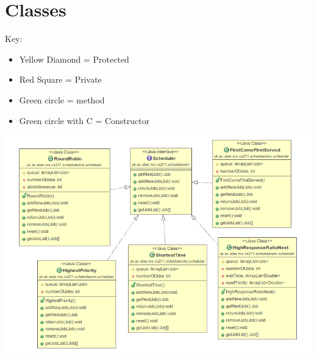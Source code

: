 \documentclass{article}
\begin{document}
\section{Classes}
Key: 
\begin{itemize}
	\item Yellow Diamond = Protected
	\item Red Square = Private
	\item Green circle = method
	\item Green circle with C = Constructor
\end{itemize}
\begin{center}
\includegraphics[scale=0.6]{class.png}
\end{center}
\end{document}
